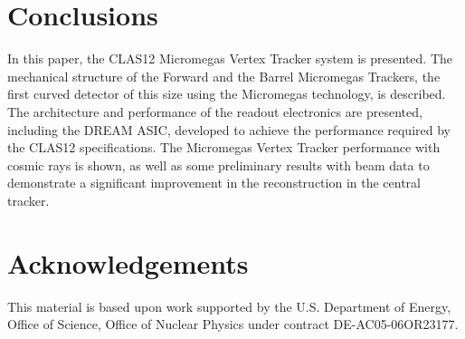 \section{Conclusions}

In this paper, the CLAS12 Micromegas Vertex Tracker system is presented. The mechanical structure of the
Forward and the Barrel Micromegas Trackers, the first curved detector of this size using the Micromegas technology,
is described. The architecture and performance of the readout electronics are presented, including the DREAM ASIC,
developed to achieve the performance required by the CLAS12 specifications. The Micromegas Vertex Tracker
performance with cosmic rays is shown, as well as some preliminary results with beam data to demonstrate a significant
improvement in the reconstruction in the central tracker.

\section{Acknowledgements}


This material is based upon work supported by the U.S. Department of Energy, Office of Science, Office of Nuclear 
Physics under contract DE-AC05-06OR23177.
